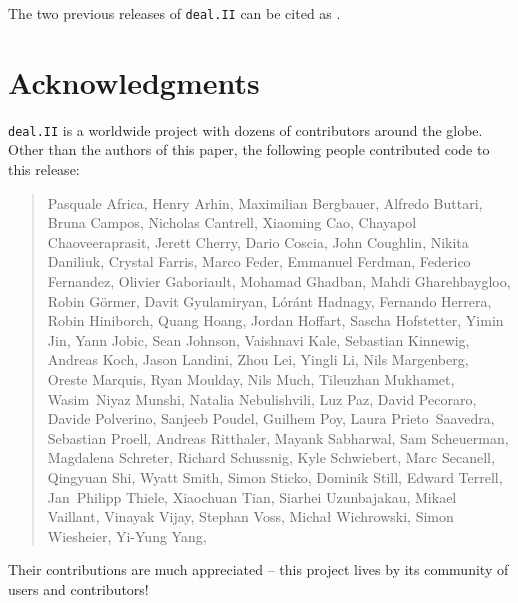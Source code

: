 \documentclass{ansarticle-preprint}
\newcommand{\specialword}[1]{\texttt{#1}}
\newcommand{\dealii}{{\specialword{deal.II}}\xspace}
\begin{document}
The two previous releases of \dealii can be cited as
\cite{dealII95,dealII96}.


\section{Acknowledgments}

\dealii is a worldwide project with dozens of contributors around the
globe. Other than the authors of this paper, the following people
contributed code to this release:\\


\begin{quote}
Pasquale     Africa,
Henry        Arhin,
Maximilian   Bergbauer,
Alfredo      Buttari,
Bruna        Campos,
Nicholas     Cantrell,
Xiaoming     Cao,
Chayapol     Chaoveeraprasit,
Jerett       Cherry,
Dario        Coscia,
John         Coughlin,
Nikita       Daniliuk,
Crystal      Farris,
Marco        Feder,
Emmanuel     Ferdman,
Federico     Fernandez,
Olivier      Gaboriault,
Mohamad      Ghadban,
Mahdi        Gharehbaygloo,
Robin        Görmer,
Davit        Gyulamiryan,
Lóránt       Hadnagy,
Fernando     Herrera,
Robin        Hiniborch,
Quang        Hoang,
Jordan       Hoffart,
Sascha       Hofstetter,
Yimin        Jin,
Yann         Jobic,
Sean         Johnson,
Vaishnavi    Kale,
Sebastian    Kinnewig,
Andreas      Koch,
Jason        Landini,
Zhou         Lei,
Yingli       Li,
Nils         Margenberg,
Oreste       Marquis,
Ryan         Moulday,
Nils         Much,
Tileuzhan    Mukhamet,
Wasim~Niyaz  Munshi,
Natalia      Nebulishvili,
Luz          Paz,
David        Pecoraro,
Davide       Polverino,
Sanjeeb      Poudel,
Guilhem      Poy,
Laura        Prieto~Saavedra,
Sebastian    Proell,
Andreas      Ritthaler,
Mayank       Sabharwal,
Sam          Scheuerman,
Magdalena    Schreter,
Richard      Schussnig,
Kyle         Schwiebert,
Marc         Secanell,
Qingyuan     Shi,
Wyatt        Smith,
Simon        Sticko,
Dominik      Still,
Edward       Terrell,
Jan~Philipp  Thiele,
Xiaochuan    Tian,
Siarhei      Uzunbajakau,
Mikael       Vaillant,
Vinayak      Vijay,
Stephan      Voss,
Michał       Wichrowski,
Simon        Wiesheier,
Yi-Yung      Yang,
\end{quote}
Their contributions are much appreciated -- this project lives by its
community of users and contributors!
\end{document}
